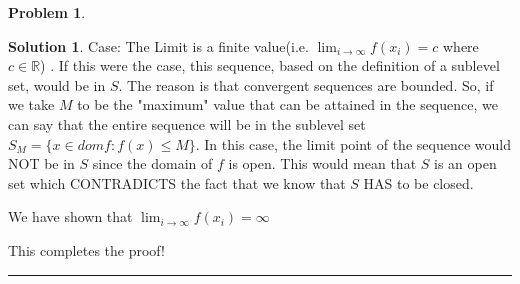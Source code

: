 \documentclass{article}
\theoremstyle{definition}
\newtheorem{problem}{Problem}
\def\fline{\rule{0.75\linewidth}{0.5pt}}
\newcommand{\finishline}{\begin{center}\fline\end{center}}
\newtheorem*{solution*}{Solution}
\newenvironment{solution}{\begin{solution*}}{{\finishline} \end{solution*}}
\begin{document}
\begin{problem}
\begin{solution}
Case: The Limit is a finite value(i.e. $\lim_{i\to\infty} f(x_i) = c$ where $c \in \mathbb{R}$) . \newline 
If this were the case, this sequence, based on the definition of a sublevel set, would be in $S$. The reason is that convergent sequences are bounded. So, if we take $M$ to be the "maximum" value that can be attained in the sequence, we can say that the entire sequence will be in the sublevel set $S_M = \{x \in dom f : f(x) \leq M \}$. In this case, the limit point of the sequence would NOT be in $S$ since the domain of $f$ is open. This would mean that $S$ is an open set which CONTRADICTS the fact that we know that $S$ HAS to be closed. \newline 

We have shown that $\lim_{i\to\infty} f(x_i) = \infty$\newline 

This completes the proof! 

\end{solution}
\end{problem}
\end{document}

